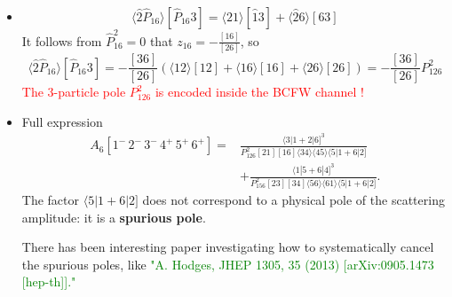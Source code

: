 \documentclass{beamer}
\newcommand{\avg}[1]{\langle #1 \rangle}
\newcommand{\cbrak}[2]{\avg{#1}\![#2]}
\begin{document}
\begin{frame}
    \begin{itemize}
    \item[] $$\cbrak{\hat{2} \hat{P}_{16}}{\hat{P}_{16} 3} = \avg{21}[\hat{1}3] + \avg{\hat{2}6}[63]$$
    It follows from $\hat{P}_{16}^2=0$ that $z_{16}=-\frac{[16]}{[26]}$, so
    \[
\cbrak{\hat{2} \hat{P}_{16}}{\hat{P}_{16} 3}
= -\frac{[36]}{[26]}
\left( \avg{12}[12] + \avg{16}[16] + \avg{26}[26] \right)
= -\frac{[36]}{[26]} P_{126}^2
\]
\textcolor{red}{The 3-particle pole $P_{126}^2$ is encoded inside the BCFW channel !}
    \item Full expression 
    \begin{align*}
        A_6[1^-\,2^-\,3^-\,4^+\,5^+\,6^+] =&
        \frac{ \langle 3|1+2|6]^3}{P_{126}^2 [21][16] \langle 34 \rangle \langle 45 \rangle \langle 5|1+6|2]}\\
        &+\frac{ \langle 1|5+6|4]^3}{P_{156}^2 [23][34] \langle 56 \rangle \langle 61 \rangle \langle 5|1+6|2]}.
    \end{align*}
    The factor $\langle 5|1+6|2]$ does not correspond to a physical pole of the scattering amplitude: it is a \textbf{spurious pole}.

    There has been interesting paper investigating how to systematically cancel the spurious poles,
    like \textcolor{green}{"A. Hodges, JHEP 1305, 35 (2013) [arXiv:0905.1473 [hep-th]]." }
    \end{itemize}
\end{frame}
\end{document}
